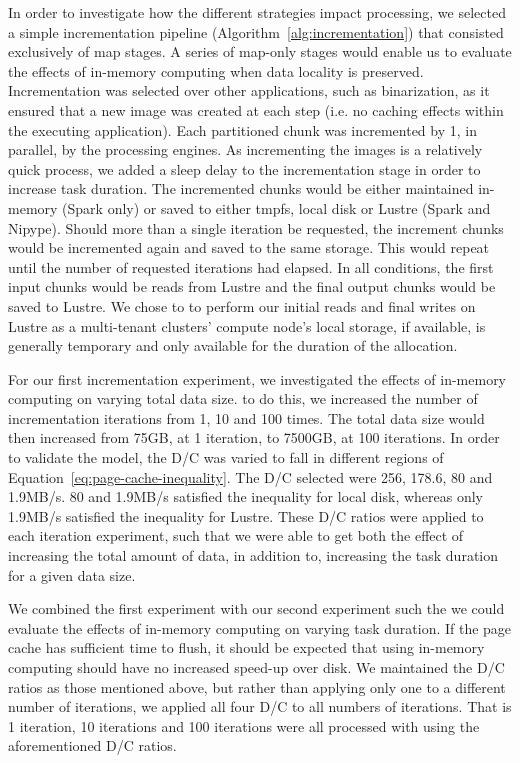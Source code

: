\documentclass{IEEEtran}
\newcommand{\todo}[1]{\marginpar{\parbox{18mm}{\flushleft\tiny\color{red}\textbf{TODO}:
      #1}}}
\begin{document}
In order to investigate how the different strategies impact processing, we 
selected a simple incrementation pipeline (Algorithm~\ref{alg:incrementation}) 
that consisted exclusively of map 
stages. A series of map-only stages would enable us to evaluate the effects of
in-memory computing when data locality is preserved. Incrementation was 
selected 
over other applications, such as binarization, as it ensured that a new image
was created at each step (i.e. no caching effects within the executing 
application). Each partitioned chunk was incremented by 1, in parallel, by
the processing engines. As incrementing the images is a relatively quick 
process, we added a sleep delay to the incrementation stage in order to 
increase task duration. The incremented chunks would be either 
maintained in-memory (Spark only) or saved to either tmpfs, local disk or 
Lustre (Spark and Nipype). Should more than a single iteration be requested, 
the increment chunks would be incremented again and saved to the same storage. 
This would repeat until the number of requested iterations had elapsed. In all 
conditions, the first input chunks would be reads from Lustre and the final 
output chunks would be saved to Lustre. We chose to to perform our initial 
reads and final writes on Lustre as a multi-tenant clusters' compute node's 
local storage, if 
available, is generally temporary and only available for the duration of the 
allocation. 

For our first incrementation experiment, we investigated the effects of
in-memory computing on varying total data size. to do this, we increased the 
number of incrementation iterations from 1, 10 and 100 times. The total data 
size would then increased from 75GB, at 1 iteration, to 7500GB, at 100 
iterations. In order
to validate the model, the D/C was varied to fall in different regions of 
Equation~\ref{eq:page-cache-inequality}. The D/C selected were 256, 178.6, 80 
and 1.9MB/s\todo{present this as a table?}. 80 and 1.9MB/s satisfied the 
inequality for local disk, whereas only 1.9MB/s satisfied the inequality for 
Lustre. These D/C ratios were applied to each iteration experiment, such that 
we were able to get both the effect of increasing the total amount of data, in 
addition to, increasing the task duration for a given data size.

We combined the first experiment with our second experiment such the we could 
evaluate the effects of in-memory computing on varying task duration. If the 
page cache has sufficient time to flush, it should be expected that using 
in-memory computing should have no increased speed-up over disk. We maintained 
the D/C ratios as those mentioned above, but rather than applying only one to
a different number of iterations, we applied all four D/C to all numbers of 
iterations. That is 1 iteration, 10 iterations and 100 iterations were all 
processed with using the aforementioned D/C ratios.
\end{document}
